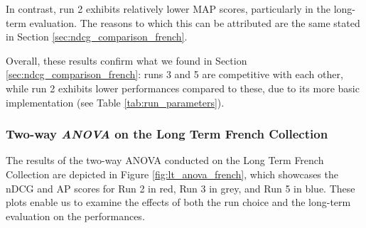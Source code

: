 In contrast, run 2 exhibits relatively lower \ac{MAP} scores, particularly in the long-term evaluation. The reasons to which this can be attributed are the same stated in Section \ref{sec:ndcg_comparison_french}.

Overall, these results confirm what we found in Section \ref{sec:ndcg_comparison_french}: runs 3 and 5 are competitive with each other, while run 2 exhibits lower performances compared to these, due to its more basic implementation (see Table \ref{tab:run_parameters}). 


\subsubsection{Two-way \textit{ANOVA} on the Long Term French Collection} \label{sec:anova_fr_lt}

The results of the two-way \ac{ANOVA} conducted on the Long Term French Collection are depicted in Figure \ref{fig:lt_anova_french}, which showcases the \ac{nDCG} and \ac{AP} scores for Run 2 in red, Run 3 in grey, and Run 5 in blue. 
These plots enable us to examine the effects of both the run choice and the long-term evaluation on the performances.


